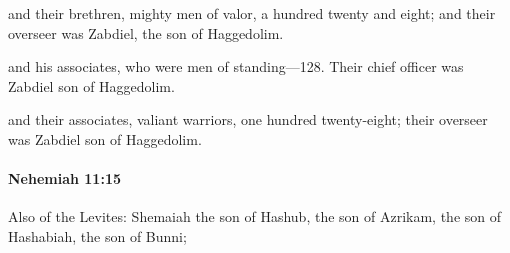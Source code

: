 			\begin{versebox}
					\item[BHS] 
					\item[LXX] 
					\item[ASV] and their brethren, mighty men of valor, a hundred twenty and eight; and their overseer was Zabdiel, the son of Haggedolim.
					\item[NIV] and his associates, who were men of standing—128. Their chief officer was Zabdiel son of Haggedolim.
					\item[NRSV] and their associates, valiant warriors, one hundred twenty-eight; their overseer was Zabdiel son of Haggedolim.
			\end{versebox}

		\paragraph{Nehemiah 11:15} %
			\label{NEHEMIAH-11-15}

			Also of the Levites: Shemaiah the son of Hashub, the son of Azrikam, the son of Hashabiah, the son of Bunni;

